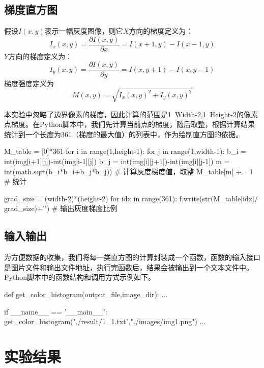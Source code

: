 \documentclass{article}
\begin{document}
\subsection{梯度直方图}
假设$I(x, y)$表示一幅灰度图像，则它$X$方向的梯度定义为：
\begin{equation}
I_{x}(x, y)=\frac{\partial I(x, y)}{\partial x}=I(x+1, y)-I(x-1, y)
\end{equation}
$Y$方向的梯度定义为：
\begin{equation}
I_{y}(x, y)=\frac{\partial I(x, y)}{\partial y}=I(x, y+1)-I(x, y-1)
\end{equation}
梯度强度定义为
\begin{equation}
M(x, y)=\sqrt{I_{x}(x, y)^{2}+I_{y}(x, y)^{2}}
\end{equation}

本实验中忽略了边界像素的梯度，因此计算的范围是1~Width-2,1~Height-2的像素点梯度。在Python脚本中，我们先计算当前点的梯度，随后取整，根据计算结果统计到一个长度为361（梯度的最大值）的列表中，作为绘制直方图的依据。
\begin{python}
M_table = [0]*361
for i in range(1,height-1):
    for j in range(1,width-1):
        b_i = int(img[i+1][j])-int(img[i-1][j])
        b_j = int(img[i][j+1])-int(img[i][j-1])
        m = int(math.sqrt(b_i*b_i+b_j*b_j))    # 计算灰度梯度值，取整
        M_table[m] += 1                        # 统计

grad_size = (width-2)*(height-2)
for idx in range(361):
    f.write(str(M_table[idx]/ grad_size)+'\n') # 输出灰度梯度比例
\end{python}

\subsection{输入输出}
为方便数据的收集，我们将每一类直方图的计算封装成一个函数，函数的输入接口是图片文件和输出文件地址，执行完函数后，结果会被输出到一个文本文件中。Python脚本中的函数结构和调用方式示例如下。

\begin{python}
def get_color_histogram(output_file,image_dir):
    ...
    
if __name__ == '__main__':
    get_color_histogram("./result/1_1.txt","./images/img1.png")
    ...
\end{python}


\section{实验结果}
\end{document}
